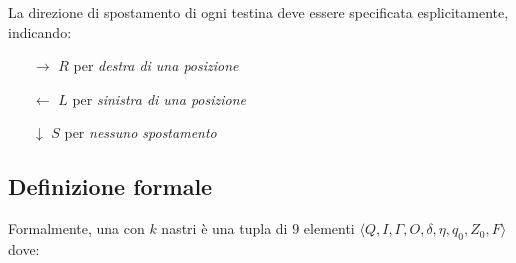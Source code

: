 \documentclass[italian, 10pt]{article}
\begin{document}
La direzione di spostamento di ogni testina deve essere specificata esplicitamente, indicando:

\begin{itemize}
  \item[\(\rightarrow\)] \(R\) per \textit{destra di una posizione}
  \item[\(\leftarrow\)] \(L\) per \textit{sinistra di una posizione}
  \item[\(\downarrow\)] \(S\) per \textit{nessuno spostamento}
\end{itemize}

\subsection{Definizione formale \TM}
\label{sec:definizione-formale-TM}

Formalmente, una \TM con \(k\) nastri è una tupla di \(9\) elementi \(\langle Q, I, \Gamma, O, \delta, \eta, q_0, Z_0, F \rangle\) dove:
\end{document}
